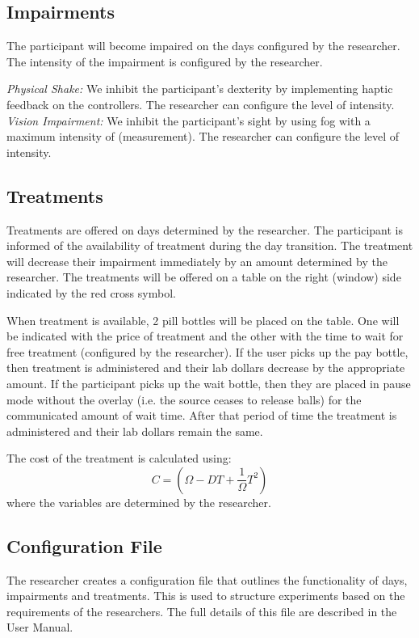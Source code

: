 \documentclass{article}
\begin{document}
\subsection{Impairments}

The participant will become impaired on the days configured by the researcher. The intensity of the impairment is configured by the researcher.

\emph{Physical Shake:}  We inhibit the participant's dexterity by implementing haptic feedback on the controllers. The researcher can configure the level of intensity.
\emph{Vision Impairment:} We inhibit the participant’s sight by using fog with a maximum intensity of (measurement). The researcher can configure the level of intensity.

\subsection{Treatments}

Treatments are offered on days determined by the researcher. The participant is informed of the availability of treatment during the day transition. The treatment will decrease their impairment immediately by an amount determined by the researcher. The treatments will be offered on a table on the right (window) side indicated by the red cross symbol.

When treatment is available, 2 pill bottles will be placed on the table. One will be indicated with the price of treatment and the other with the time to wait for free treatment (configured by the researcher). If the user picks up the pay bottle, then treatment is administered and their lab dollars decrease by the appropriate amount. If the participant picks up the wait bottle, then they are placed in pause mode without the overlay (i.e. the source ceases to release balls) for the communicated amount of wait time. After that period of time the treatment is administered and their lab dollars remain the same.\newline

The cost of the treatment is calculated using: 
\[ C = (\Omega - DT + \frac{1}{\Omega}T^2)\]
where the variables are determined by the researcher.


\subsection{Configuration File}
The researcher creates a configuration file that outlines the functionality of days, impairments and treatments. This is used to structure experiments based on the requirements of the researchers. The full details of this file are described in the User Manual.
\end{document}

